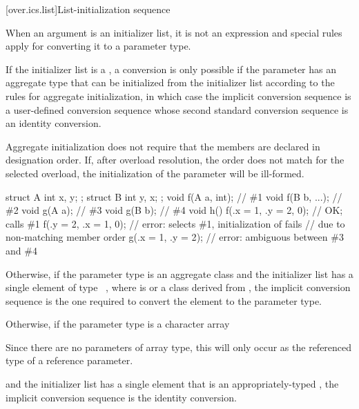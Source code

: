 [over.ics.list]{List-initialization sequence}

\pnum
When an argument is an initializer list, it is not an
expression and special rules apply for converting it to a parameter type.

\pnum
If the initializer list is a ,
a conversion is only possible if
the parameter has an aggregate type
that can be initialized from the initializer list
according to the rules for aggregate initialization,
in which case the implicit conversion sequence is
a user-defined conversion sequence
whose second standard conversion sequence
is an identity conversion.
\begin{note}
Aggregate initialization does not require that
the members are declared in designation order.
If, after overload resolution, the order does not match
for the selected overload,
the initialization of the parameter will be ill-formed.
\begin{example}
\begin{codeblock}
struct A { int x, y; };
struct B { int y, x; };
void f(A a, int);               // \#1
void f(B b, ...);               // \#2
void g(A a);                    // \#3
void g(B b);                    // \#4
void h() {
  f({.x = 1, .y = 2}, 0);       // OK; calls \#1
  f({.y = 2, .x = 1}, 0);       // error: selects \#1, initialization of  fails
                                // due to non-matching member order
  g({.x = 1, .y = 2});          // error: ambiguous between \#3 and \#4
}
\end{codeblock}
\end{example}
\end{note}

\pnum
Otherwise,
if the parameter type is an aggregate class  and the initializer list has a
single element of type \cv{}~, where  is 
or a class derived from , the implicit conversion sequence is the one
required to convert the element to the parameter type.

\pnum
Otherwise, if the parameter type is a character array
\begin{footnote}
Since there are no parameters of array type,
this will only occur as the referenced type of a reference parameter.
\end{footnote}
and the initializer list has a single element that is an appropriately-typed
, the implicit conversion
sequence is the identity conversion.

